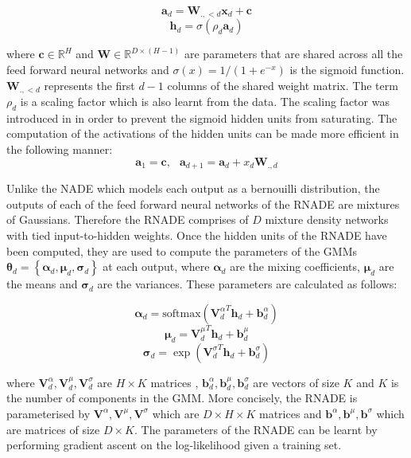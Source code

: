 \documentclass{article} %
\begin{document}
$$ \mathbf{a}_d = \boldsymbol{W}_{.,<d}\boldsymbol{x}_d + \mathbf{c}$$
$$ \boldsymbol{h}_d = \sigma (\rho_d \mathbf{a}_d)$$


where $\mathbf{c} \in \mathbb{R}^{H}$ and $\boldsymbol{W} \in \mathbb{R}^{D \times (H-1)}$ are parameters that are shared across all the feed forward neural networks and $\sigma(x) = 1/(1+e^{-x})$ is the sigmoid function. $\boldsymbol{W}_{.,<d}$ represents the first $d-1$ columns of the shared weight matrix. The term $\rho_d$ is a scaling factor which is also learnt from the data. The scaling factor was introduced in \cite{AISTATS2011_Bengio11} in order to prevent the sigmoid hidden units from saturating. The computation of the activations of the hidden units can be made more efficient in the following manner:
$$ \mathbf{a}_1 = \mathbf{c}, \: \: \; \mathbf{a}_{d+1} = \mathbf{a}_{d} + x_d \mathbf{W}_{.,d}$$

 Unlike the NADE which models each output as a bernouilli distribution, the outputs of each of the feed forward neural networks of the RNADE are mixtures of Gaussians. Therefore the RNADE comprises of $D$ mixture density networks with tied input-to-hidden weights. Once the hidden units of the RNADE have been computed, they are used to compute the parameters of the GMMs $\boldsymbol{\theta}_d  = \left\{ \boldsymbol{\alpha}_d, \boldsymbol{\mu}_d, \boldsymbol{\sigma}_d \right\}$ at each output, where $\boldsymbol{\alpha}_d$ are the mixing coefficients, $\boldsymbol{\mu}_d$ are the means and $\boldsymbol{\sigma}_d$ are the variances. These parameters are calculated as follows:

$$ \boldsymbol{\alpha}_d = \text{softmax} ({\mathbf{V}_{d}^{\alpha}}^T \mathbf{h}_d + \mathbf{b}^{\alpha}_{d})$$
$$ \boldsymbol{\mu}_d = {\mathbf{V}_{d}^{\mu}}^T \mathbf{h}_d + \mathbf{b}^{\mu}_{d}$$
$$ \boldsymbol{\sigma}_d = \exp ({\mathbf{V}_{d}^{\sigma}}^T \mathbf{h}_d + \mathbf{b}^{\sigma}_{d})$$

where $ \mathbf{V}_{d}^{\alpha},\mathbf{V}_{d}^{\mu},\mathbf{V}_{d}^{\sigma}$ are $H \times K$ matrices , $\mathbf{b}^{\alpha}_{d},\mathbf{b}^{\mu}_{d},\mathbf{b}^{\sigma}_{d}$ are vectors of size $K$ and $K$ is the number of components in the GMM. More concisely, the RNADE is parameterised by $\mathbf{V}^{\alpha},\mathbf{V}^{\mu},\mathbf{V}^{\sigma}$ which are $D \times H \times K$ matrices and $\mathbf{b}^{\alpha},\mathbf{b}^{\mu},\mathbf{b}^{\sigma}$ which are matrices of size $D \times K $.
The parameters of the RNADE can be learnt by performing gradient ascent on the log-likelihood given a training set. 
\end{document}
